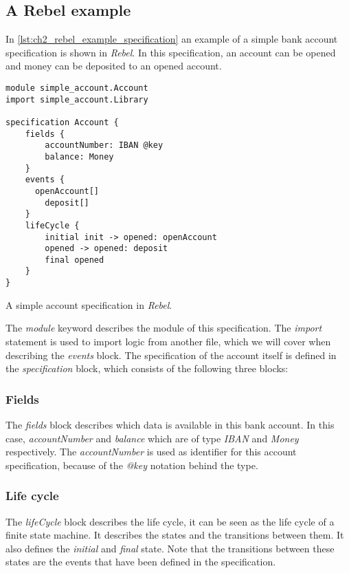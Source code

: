 \subsection{A Rebel example}
\label{ssct:2_rebel_example}
In \autoref{lst:ch2_rebel_example_specification} an example of a simple bank
account specification is shown in \textit{Rebel}. In this specification, an
account can be opened and money can be deposited to an opened account.
\begin{sourcecode}[!ht]
\begin{lstlisting}[language=Rebel]
module simple_account.Account
import simple_account.Library

specification Account {
	fields {
		accountNumber: IBAN @key
		balance: Money
	}
	events {
	  openAccount[]
		deposit[]
	}
	lifeCycle {
		initial init -> opened: openAccount
		opened -> opened: deposit
		final opened
	}
}
\end{lstlisting}
\caption{A simple account specification in \textit{Rebel}.}
\label{lst:ch2_rebel_example_specification}
\end{sourcecode}
\FloatBarrier\noindent
The \textit{module} keyword describes the module of this specification. The
\textit{import} statement is used to import logic from another file, which we
will cover when describing the \textit{events} block. The specification of the
account itself is defined in the \textit{specification} block, which consists
of the following three blocks:

\subsubsection{Fields}
The \textit{fields} block describes which data is available in this bank
account. In this case, \textit{accountNumber} and \textit{balance} which are of
type \textit{IBAN} and \textit{Money} respectively. The \textit{accountNumber}
is used as identifier for this account specification, because of the
\textit{@key} notation behind the type.

\subsubsection{Life cycle}
The \textit{lifeCycle} block describes the life cycle, it can be seen as the
life cycle of a finite state machine. It describes the states and the
transitions between them. It also defines the \textit{initial} and
\textit{final} state. Note that the transitions between these states are the
events that have been defined in the specification.

